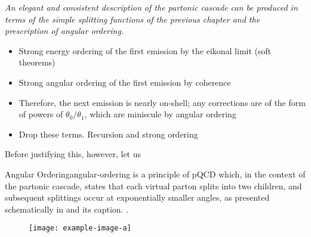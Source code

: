 \textit{An elegant and consistent description of the partonic cascade can be produced in terms of the simple splitting functions of the previous chapter and the prescription of angular ordering.}



\begin{itemize}
    \item
Strong energy ordering of the first emission by the eikonal limit (soft theorems)

    \item
Strong angular ordering of the first emission by coherence

    \item
Therefore, the next emission is nearly on-shell;
%
any corrections are of the form of powers of \(\theta_0/\theta_1\), which are miniscule by angular ordering

    \item
Drop these terms. Recursion and strong ordering
\end{itemize}



\cite{osti_4367332} %

\cite{Mueller:1981ex} %

\cite{Dokshitzer:1982fh,Webber:1983if,Marchesini:1983bm} %

\cite{Ciafaloni:1984zr} %

\cite{Ellis:1996mzs} %

%
Before justifying this, however, let us
\begin{definitionbox}{Angular Ordering}{angular-ordering}
     is a principle of pQCD which, in the context of the partonic cascade, states that each virtual parton splits into two children, and subsequent splittings occur at exponentially smaller angles, as presented schematically in  and its caption.
    .
\end{definitionbox}

\begin{figure}[]
    \centering
    \texttt{[image: example-image-a]}
    \caption{
    }
    \label{fig:angular-ordering}
\end{figure}



